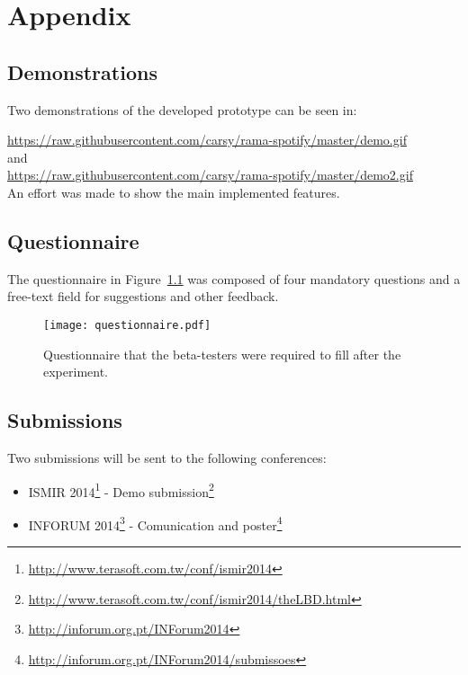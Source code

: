 
\chapter{Appendix}
\label{appendix}

  \section{Demonstrations} %
  \label{sec:demonstrations}
  
    Two demonstrations of the developed prototype can be seen in:

    \url{https://raw.githubusercontent.com/carsy/rama-spotify/master/demo.gif} \\
    and \\
    \indent \url{https://raw.githubusercontent.com/carsy/rama-spotify/master/demo2.gif} \\

    An effort was made to show the main implemented features.
    


  \section{Questionnaire} %
  \label{sec:questionnaire}

    The questionnaire in Figure~\ref{fig:questionnaire} was composed of four mandatory questions and a free-text field for suggestions and other feedback.
  
    \begin{figure}
      \begin{center}
        \texttt{[image: questionnaire.pdf]}
      \end{center}
      \caption{Questionnaire that the beta-testers were required to fill after the experiment.}
      \label{fig:questionnaire}
    \end{figure}
  

  \section{Submissions} %
  \label{sec:submissions}
  
    Two submissions will be sent to the following conferences:

    \begin{itemize}
      \item ISMIR 2014\footnote{\url{http://www.terasoft.com.tw/conf/ismir2014}} - Demo submission\footnote{\url{http://www.terasoft.com.tw/conf/ismir2014/theLBD.html}}
      \item INFORUM 2014\footnote{\url{http://inforum.org.pt/INForum2014}} - Comunication and poster\footnote{\url{http://inforum.org.pt/INForum2014/submissoes}}
    \end{itemize}


  

